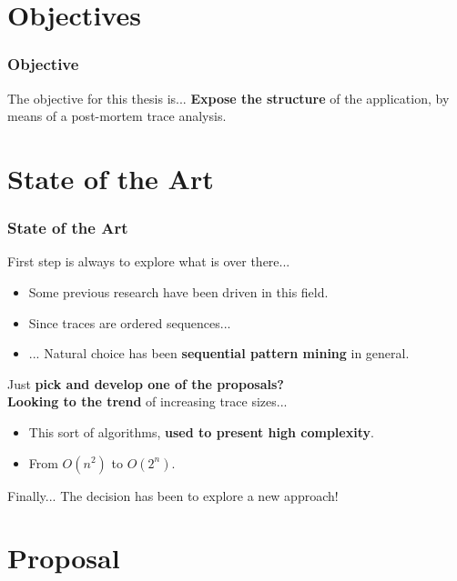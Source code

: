 \documentclass{beamer}
\begin{document}
\section{Objectives}
\begin{frame}
\frametitle{Objective}
	\begin{exampleblock}{The objective for this thesis is...}
		\textbf{Expose the structure} of the application, by means of a post-mortem trace analysis.
	\end{exampleblock}
\end{frame}

\section{State of the Art}

\begin{frame}
\frametitle{State of the Art}
	First step is always to explore what is over there...
	\begin{itemize}
		\item Some previous research have been driven in this field.
		\item Since traces are ordered sequences...
		\item ... Natural choice has been \textbf{sequential pattern mining} in general.
	\end{itemize}
	\vfill
	\pause
	Just \textbf{pick and develop one of the proposals?}\\
	\pause
	\vfill
	\textbf{Looking to the trend} of increasing trace sizes...\\
	\begin{itemize}
		\item This sort of algorithms, \textbf{used to present high complexity}.
		\item From $O(n^{2})$ to $O(2^{n})$.
	\end{itemize}
	\pause
	\begin{block}{Finally...}
		The decision has been to explore a new approach!
	\end{block}
\end{frame}

\section{Proposal}
\end{document}

